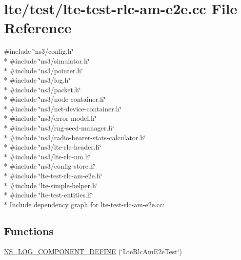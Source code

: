 \hypertarget{lte-test-rlc-am-e2e_8cc}{}\section{lte/test/lte-\/test-\/rlc-\/am-\/e2e.cc File Reference}
\label{lte-test-rlc-am-e2e_8cc}
{\ttfamily \#include \char`\"{}ns3/config.\+h\char`\"{}}\\*
{\ttfamily \#include \char`\"{}ns3/simulator.\+h\char`\"{}}\\*
{\ttfamily \#include \char`\"{}ns3/pointer.\+h\char`\"{}}\\*
{\ttfamily \#include \char`\"{}ns3/log.\+h\char`\"{}}\\*
{\ttfamily \#include \char`\"{}ns3/packet.\+h\char`\"{}}\\*
{\ttfamily \#include \char`\"{}ns3/node-\/container.\+h\char`\"{}}\\*
{\ttfamily \#include \char`\"{}ns3/net-\/device-\/container.\+h\char`\"{}}\\*
{\ttfamily \#include \char`\"{}ns3/error-\/model.\+h\char`\"{}}\\*
{\ttfamily \#include \char`\"{}ns3/rng-\/seed-\/manager.\+h\char`\"{}}\\*
{\ttfamily \#include \char`\"{}ns3/radio-\/bearer-\/stats-\/calculator.\+h\char`\"{}}\\*
{\ttfamily \#include \char`\"{}ns3/lte-\/rlc-\/header.\+h\char`\"{}}\\*
{\ttfamily \#include \char`\"{}ns3/lte-\/rlc-\/um.\+h\char`\"{}}\\*
{\ttfamily \#include \char`\"{}ns3/config-\/store.\+h\char`\"{}}\\*
{\ttfamily \#include \char`\"{}lte-\/test-\/rlc-\/am-\/e2e.\+h\char`\"{}}\\*
{\ttfamily \#include \char`\"{}lte-\/simple-\/helper.\+h\char`\"{}}\\*
{\ttfamily \#include \char`\"{}lte-\/test-\/entities.\+h\char`\"{}}\\*
Include dependency graph for lte-\/test-\/rlc-\/am-\/e2e.cc\+:
\subsection*{Functions}
\begin{DoxyCompactItemize}
\item 
\hyperlink{lte-test-rlc-am-e2e_8cc_a5aa7ad18a5bda1e669ca65cbe46d2378}{N\+S\+\_\+\+L\+O\+G\+\_\+\+C\+O\+M\+P\+O\+N\+E\+N\+T\+\_\+\+D\+E\+F\+I\+NE} (\char`\"{}Lte\+Rlc\+Am\+E2e\+Test\char`\"{})
\end{DoxyCompactItemize}
